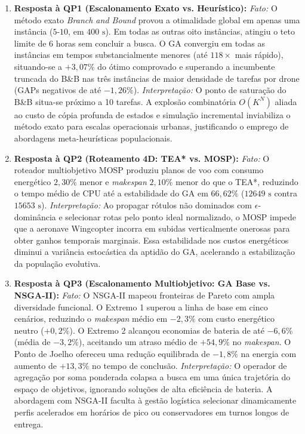 \begin{enumerate}
    \item \textbf{Resposta à QP1 (Escalonamento Exato vs. Heurístico):}  
    \textit{Fato:} O método exato \textit{Branch and Bound} provou a otimalidade global em apenas uma instância ($5\text{-}10$, em $400\text{ s}$). Em todas as outras oito instâncias, atingiu o teto limite de 6 horas sem concluir a busca. O GA convergiu em todas as instâncias em tempos substancialmente menores (até $118\times$ mais rápido), situando-se a $+3{,}07\%$ do ótimo comprovado e superando a incumbente truncada do B\&B nas três instâncias de maior densidade de tarefas por drone (GAPs negativos de até $-1{,}26\%$).  
    \textit{Interpretação:} O ponto de saturação do B\&B situa-se próximo a 10 tarefas. A explosão combinatória $O(K^N)$ aliada ao custo de cópia profunda de estados e simulação incremental inviabiliza o método exato para escalas operacionais urbanas, justificando o emprego de abordagens meta-heurísticas populacionais.

    \item \textbf{Resposta à QP2 (Roteamento 4D: TEA* vs. MOSP):}  
    \textit{Fato:} O roteador multiobjetivo MOSP produziu planos de voo com consumo energético $2{,}30\%$ menor e \textit{makespan} $2{,}10\%$ menor do que o TEA*, reduzindo o tempo médio de CPU até a estabilidade do GA em $66{,}62\%$ ($12649\text{ s}$ contra $15653\text{ s}$).  
    \textit{Interpretação:} Ao propagar rótulos não dominados com $\epsilon$-dominância e selecionar rotas pelo ponto ideal normalizado, o MOSP impede que a aeronave Wingcopter incorra em subidas verticalmente onerosas para obter ganhos temporais marginais. Essa estabilidade nos custos energéticos diminui a variância estocástica da aptidão do GA, acelerando a estabilização da população evolutiva.

    \item \textbf{Resposta à QP3 (Escalonamento Multiobjetivo: GA Base vs. NSGA-II):}  
    \textit{Fato:} O NSGA-II mapeou fronteiras de Pareto com ampla diversidade funcional. O Extremo 1 superou a linha de base em cinco cenários, reduzindo o \textit{makespan} médio em $-2{,}3\%$ com custo energético neutro ($+0{,}2\%$). O Extremo 2 alcançou economias de bateria de até $-6{,}6\%$ (média de $-3{,}2\%$), aceitando um atraso médio de $+54{,}9\%$ no \textit{makespan}. O Ponto de Joelho ofereceu uma redução equilibrada de $-1{,}8\%$ na energia com aumento de $+13{,}3\%$ no tempo de conclusão.  
    \textit{Interpretação:} O operador de agregação por soma ponderada colapsa a busca em uma única trajetória do espaço de objetivos, ignorando soluções de alta eficiência de bateria. A abordagem com NSGA-II faculta à gestão logística selecionar dinamicamente perfis acelerados em horários de pico ou conservadores em turnos longos de entrega.


\end{enumerate}
